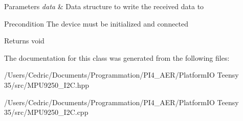 \begin{DoxyParams}{Parameters}
{\em data} & Data structure to write the received data to \\
\hline
\end{DoxyParams}
\begin{DoxyPrecond}{Precondition}
The device must be initialized and connected 
\end{DoxyPrecond}
\begin{DoxyReturn}{Returns}
void 
\end{DoxyReturn}


The documentation for this class was generated from the following files\+:\begin{DoxyCompactItemize}
\item 
/\+Users/\+Cedric/\+Documents/\+Programmation/\+P\+I4\+\_\+\+A\+E\+R/\+Platform\+I\+O Teensy 35/src/M\+P\+U9250\+\_\+\+I2\+C.\+hpp\item 
/\+Users/\+Cedric/\+Documents/\+Programmation/\+P\+I4\+\_\+\+A\+E\+R/\+Platform\+I\+O Teensy 35/src/M\+P\+U9250\+\_\+\+I2\+C.\+cpp\end{DoxyCompactItemize}
